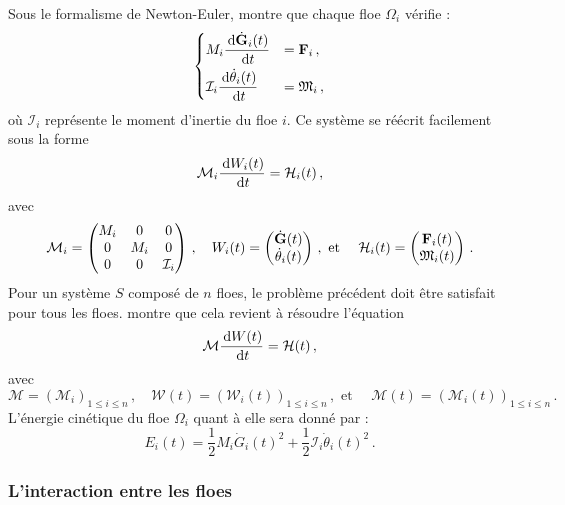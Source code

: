 Sous le formalisme de Newton-Euler, \citeauthor{rabatel2015thesis} montre que chaque floe $\Omega_i$ vérifie :
$$
    \begin{dcases}
        M_i \frac{\diff \dot{\bvec{G}}_i(t)}{\diff t} &= \bvec{F}_i\,, \\
        \mathcal{I}_i \frac{\diff \dot{\theta}_i(t)}{\diff t} &= \mathfrak{M}_i\,,
    \end{dcases}
$$
où $\mathcal{I}_i$ représente le moment d'inertie du floe $i$. Ce système se réécrit facilement sous la forme 
\begin{align}    
    \mathcal{M}_i \frac{\diff W_i(t)}{\diff t} = \mathcal{H}_i(t) \,,
\end{align}
avec 
$$
\mathcal{M}_i = 
\begin{pmatrix}
    M_i & 0 & 0 \\ 0 & M_i & 0 \\ 0 & 0 & \mathcal{I}_i
\end{pmatrix} \,, \quad
W_i(t) = 
\begin{pmatrix}
    \dot{\bm{\mathrm{G}}}(t) \\ \dot{\theta}_i(t)
\end{pmatrix} \,,
\text{ et } \quad \mathcal{H}_i(t) = 
\begin{pmatrix}
    \bm{\mathrm{F}}_i(t) \\ \mathfrak{M}_i(t)
\end{pmatrix} \,.
$$
Pour un système $S$ composé de $n$ floes, le problème précédent doit être satisfait pour tous les floes. \parencite[p.18]{rabatel2015thesis} montre que cela revient à résoudre l'équation
\begin{align} \label{eq:bilan1}
    \mathcal{M} \frac{\diff W(t)}{\diff t} = \mathcal{H}(t) \,,
\end{align}
avec 
$$
\mathcal{M} = (\mathcal{M}_i)_{1\leq i \leq n } \,, \quad
\mathcal{W}(t) = (\mathcal{W}_i(t))_{1\leq i \leq n } \,, \text{ et } \quad
\mathcal{M}(t) = (\mathcal{M}_i(t))_{1\leq i \leq n }  \,.
$$
L'énergie cinétique du floe $\Omega_i$ quant à elle sera donné par :
$$
E_i(t) = \frac{1}{2}M_i \dot{G}_i(t)^2 + \frac{1}{2}\mathcal{I}_i \dot{\theta}_i(t)^2 \,. 
$$ 


\subsubsection{L'interaction entre les floes}


